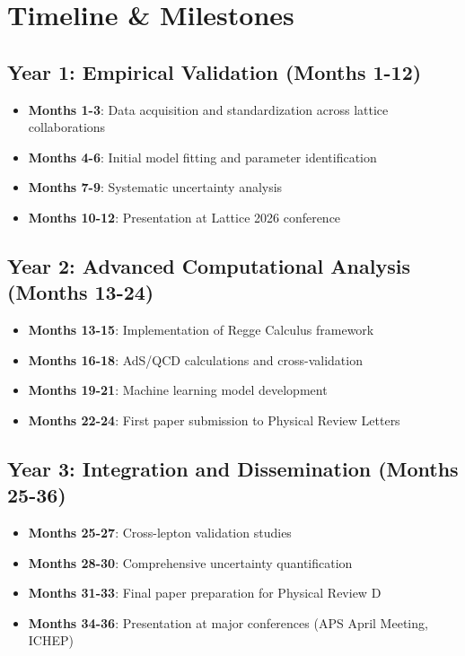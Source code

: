 ﻿\documentclass[12pt]{article}
\theoremstyle{definition}
\theoremstyle{plain}
\begin{document}
\section{Timeline \& Milestones}


\subsection{Year 1: Empirical Validation (Months 1-12)}
\begin{itemize}
    \item \textbf{Months 1-3}: Data acquisition and standardization across lattice collaborations
    \item \textbf{Months 4-6}: Initial model fitting and parameter identification
    \item \textbf{Months 7-9}: Systematic uncertainty analysis
    \item \textbf{Months 10-12}: Presentation at Lattice 2026 conference
\end{itemize}


\subsection{Year 2: Advanced Computational Analysis (Months 13-24)}
\begin{itemize}
    \item \textbf{Months 13-15}: Implementation of Regge Calculus framework
    \item \textbf{Months 16-18}: AdS/QCD calculations and cross-validation
    \item \textbf{Months 19-21}: Machine learning model development
    \item \textbf{Months 22-24}: First paper submission to Physical Review Letters
\end{itemize}


\subsection{Year 3: Integration and Dissemination (Months 25-36)}
\begin{itemize}
    \item \textbf{Months 25-27}: Cross-lepton validation studies
    \item \textbf{Months 28-30}: Comprehensive uncertainty quantification
    \item \textbf{Months 31-33}: Final paper preparation for Physical Review D
    \item \textbf{Months 34-36}: Presentation at major conferences (APS April Meeting, ICHEP)
\end{itemize}
\end{document}
